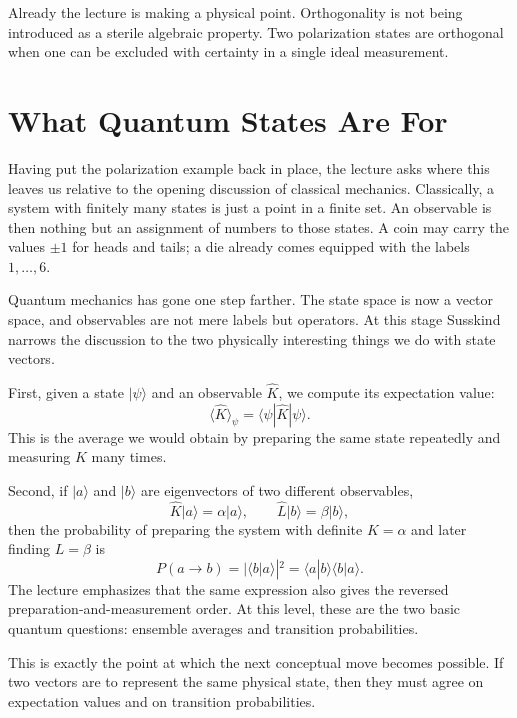 Already the lecture is making a physical point. Orthogonality is not being introduced as a sterile algebraic property. Two polarization states are orthogonal when one can be excluded with certainty in a single ideal measurement.

\section{What Quantum States Are For}

Having put the polarization example back in place, the lecture asks where this leaves us relative to the opening discussion of classical mechanics. Classically, a system with finitely many states is just a point in a finite set. An observable is then nothing but an assignment of numbers to those states. A coin may carry the values $\pm 1$ for heads and tails; a die already comes equipped with the labels $1,\dots,6$.

Quantum mechanics has gone one step farther. The state space is now a vector space, and observables are not mere labels but operators. At this stage Susskind narrows the discussion to the two physically interesting things we do with state vectors.

First, given a state $|\psi\rangle$ and an observable $\hat K$, we compute its expectation value:
\begin{equation}
\langle \hat K\rangle_\psi=\langle\psi|\hat K|\psi\rangle.
\end{equation}
This is the average we would obtain by preparing the same state repeatedly and measuring $K$ many times.

Second, if $|a\rangle$ and $|b\rangle$ are eigenvectors of two different observables,
\begin{equation}
\hat K|a\rangle=\alpha|a\rangle,
\qquad
\hat L|b\rangle=\beta|b\rangle,
\end{equation}
then the probability of preparing the system with definite $K=\alpha$ and later finding $L=\beta$ is
\begin{equation}
P(a\to b)=|\langle b|a\rangle|^2
=\langle a|b\rangle\langle b|a\rangle.
\end{equation}
The lecture emphasizes that the same expression also gives the reversed preparation-and-measurement order. At this level, these are the two basic quantum questions: ensemble averages and transition probabilities.

This is exactly the point at which the next conceptual move becomes possible. If two vectors are to represent the same physical state, then they must agree on expectation values and on transition probabilities.

